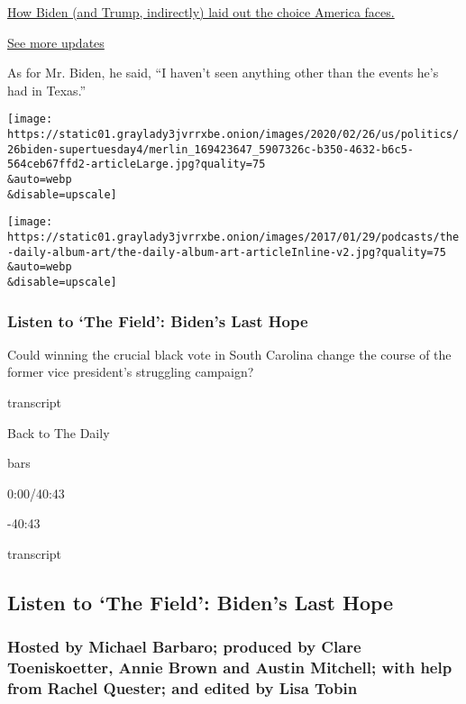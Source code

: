 \href{https://www.nytimes3xbfgragh.onion/live/2020/08/21/us/dnc-convention-election?action=click\&pgtype=Article\&state=default\&region=MAIN_CONTENT_1\&context=storylines_live_updates\#how-biden-and-trump-indirectly-laid-out-the-choice-america-faces}{How
Biden (and Trump, indirectly) laid out the choice America faces.}

\href{https://www.nytimes3xbfgragh.onion/live/2020/08/21/us/dnc-convention-election?action=click\&pgtype=Article\&state=default\&region=MAIN_CONTENT_1\&context=storylines_live_updates}{See
more updates}

As for Mr. Biden, he said, ``I haven't seen anything other than the
events he's had in Texas.''

\texttt{[image: https://static01.graylady3jvrrxbe.onion/images/2020/02/26/us/politics/26biden-supertuesday4/merlin\_169423647\_5907326c-b350-4632-b6c5-564ceb67ffd2-articleLarge.jpg?quality=75\\\&auto=webp\\\&disable=upscale]}

\texttt{[image: https://static01.graylady3jvrrxbe.onion/images/2017/01/29/podcasts/the-daily-album-art/the-daily-album-art-articleInline-v2.jpg?quality=75\\\&auto=webp\\\&disable=upscale]}

\hypertarget{listen-to-the-field-bidens-last-hope}{%
\subsubsection{Listen to `The Field': Biden's Last
Hope}\label{listen-to-the-field-bidens-last-hope}}

Could winning the crucial black vote in South Carolina change the course
of the former vice president's struggling campaign?

transcript

Back to The Daily

bars

0:00/40:43

-40:43

transcript

\hypertarget{listen-to-the-field-bidens-last-hope-1}{%
\subsection{Listen to `The Field': Biden's Last
Hope}\label{listen-to-the-field-bidens-last-hope-1}}

\hypertarget{hosted-by-michael-barbaro-produced-by-clare-toeniskoetter-annie-brown-and-austin-mitchell-with-help-from-rachel-quester-and-edited-by-lisa-tobin}{%
\subsubsection{Hosted by Michael Barbaro; produced by Clare
Toeniskoetter, Annie Brown and Austin Mitchell; with help from Rachel
Quester; and edited by Lisa
Tobin}\label{hosted-by-michael-barbaro-produced-by-clare-toeniskoetter-annie-brown-and-austin-mitchell-with-help-from-rachel-quester-and-edited-by-lisa-tobin}}

